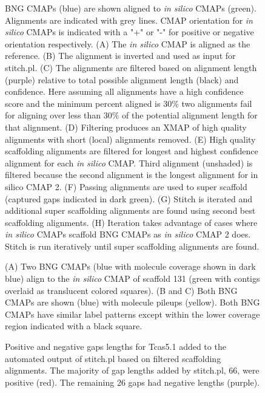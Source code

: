 \documentclass{bmcart}
\begin{document}
\begin{backmatter}
  \begin{figure}[h!]
  \caption{
      BNG CMAPs (blue) are shown aligned to \textit{in silico} CMAPs (green). Alignments are indicated with grey lines. CMAP orientation for \textit{in silico} CMAPs is indicated with a "+" or "-" for positive or negative orientation respectively. (A) The \textit{in silico} CMAP is aligned as the reference. (B) The alignment is inverted and used as input for stitch.pl. (C) The alignments are filtered based on alignment length (purple) relative to total possible alignment length (black) and confidence. Here assuming all alignments have a high confidence score and the minimum percent aligned is 30\% two alignments fail for aligning over less than 30\% of the potential alignment length for that alignment. (D) Filtering produces an XMAP of high quality alignments with short (local) alignments removed. (E) High quality scaffolding alignments are filtered for longest and highest confidence alignment for each \textit{in silico} CMAP. Third alignment (unshaded) is filtered because the second alignment is the longest alignment for {in silico} CMAP 2. (F) Passing alignments are used to super scaffold (captured gaps indicated in dark green). (G) Stitch is iterated and additional super scaffolding alignments are found using second best scaffolding alignments. (H) Iteration takes advantage of cases where \textit{in silico} CMAPs scaffold BNG CMAPs as \textit{in silico} CMAP 2 does. Stitch is run iteratively until super scaffolding alignments are found.}
      \end{figure}      
\begin{figure}[h!]
	\caption{
		(A) Two BNG CMAPs (blue with molecule coverage shown in dark blue) align to the \textit{in silico} CMAP of scaffold 131 (green with contigs overlaid as translucent colored squares). (B and C) Both BNG CMAPs are shown (blue) with molecule pileups (yellow). Both BNG CMAPs have similar label patterns except within the lower coverage region indicated with a black square.}
\end{figure}  
\begin{figure}[h!]
	\caption{
		Positive and negative gaps lengths for Tcas5.1 added to the automated output of stitch.pl based on filtered scaffolding alignments. The majority of gap lengths added by stitch.pl, 66, were positive (red). The remaining 26 gaps had negative lengths (purple).}
      \end{figure}                      

\end{backmatter}
\end{document}

